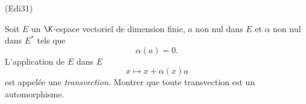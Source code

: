 \begin{tiny}(Edi31)\end{tiny} Soit $E$ un $\K$-espace vectoriel de dimension finie, $a$ non nul dans $E$ et $\alpha$ non nul dans $E^*$ tels que
\[
  \alpha(a) = 0.
\]
L'application de $E$ dans $E$
\[
  x \mapsto x + \alpha(x)a
\]
est appelée une \emph{transvection}. 
Montrer que toute transvection est un automorphisme.
